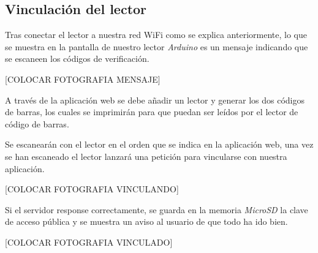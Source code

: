 \subsection{Vinculación del lector}

Tras conectar el lector a nuestra red WiFi como se explica anteriormente, lo que se muestra en la pantalla de nuestro lector \emph{Arduino} es un mensaje indicando que se escaneen los códigos de verificación.

    [COLOCAR FOTOGRAFIA MENSAJE]

A través de la aplicación web se debe añadir un lector y generar los dos códigos de barras, los cuales se imprimirán para que puedan ser leídos por el lector de código de barras.

Se escanearán con el lector en el orden que se indica en la aplicación web, una vez se han escaneado el lector lanzará una petición para vincularse con nuestra aplicación.

    [COLOCAR FOTOGRAFIA VINCULANDO]

Si el servidor response correctamente, se guarda en la memoria \emph{MicroSD} la clave de acceso pública y se muestra un aviso al usuario de que todo ha ido bien.

    [COLOCAR FOTOGRAFIA VINCULADO]


